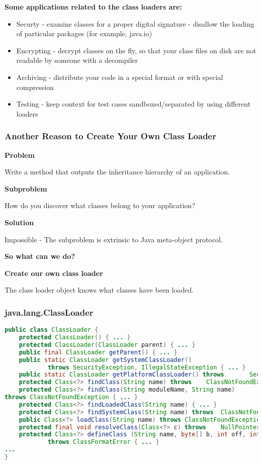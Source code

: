 \textbf{Some applications related to the class loaders are:}
\begin{itemize}
	\item Securty
	- examine classes for a proper digital signature
	- disallow the loading of particular packages (for example, java.io)
	\item Encrypting
	-  decrypt classes on the fly, so that your class files on disk are not readable by someone with a decompiler
	\item Archiving
	- distribute your code in a special format or with special compression
	\item Testing
	- keep context for test cases sandboxed/separated by using different loaders
\end{itemize}

\subsubsection{Another Reason to Create Your Own Class Loader}

\textbf{Problem}

Write a method that outputs the inheritance hierarchy of an
application.

\textbf{Subproblem}

How do you discover what classes belong to your application?

\textbf{Solution}

Impossible - The subproblem is extrinsic to Java meta-object
protocol.

\textbf{So what can we do?}

\begin{center}
\textbf{Create our own class loader}
\end{center}

The class loader object knows what classes have been loaded.

\subsubsection{java.lang.ClassLoader}

\begin{lstlisting}[language=Java]
public class ClassLoader {
	protected ClassLoader() { ... }
	protected ClassLoader(ClassLoader parent) { ... }
	public final ClassLoader getParent() { ... }
	public static ClassLoader getSystemClassLoader()
			throws SecurityException, IllegalStateException { ... }
	public static ClassLoader getPlatformClassLoader() throws 		SecurityException { ... }
	protected Class<?> findClass(String name) throws 	ClassNotFoundException { ... }
	protected Class<?> findClass(String moduleName, String name)
throws ClassNotFoundException { ... }
	protected Class<?> findLoadedClass(String name) { ... }
	protected Class<?> findSystemClass(String name) throws 	ClassNotFoundException { ... }
	public Class<?> loadClass(String name) throws ClassNotFoundException { ... }
	protected final void resolveClass(Class<?> c) throws 	NullPointerException { ... }
	protected Class<?> defineClass (String name, byte[] b, int off, int len)
			throws ClassFormatError { ... }
...
}
\end{lstlisting}

